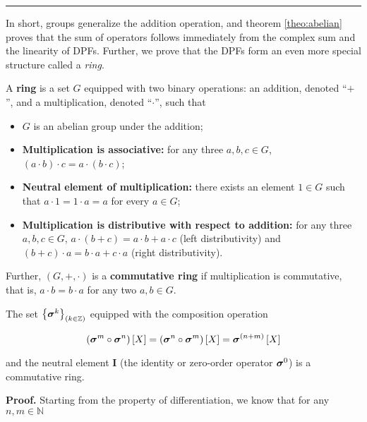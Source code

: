\vspace{5mm}
\hrule
\vspace{5mm} %

	In short, groups generalize the addition operation, and theorem \ref{theo:abelian} proves that the sum of operators follows immediately from the complex sum and the linearity of DPFs. Further, we prove that the DPFs form an even more special structure called a \textit{ring}.

\begin{definition}[Ring]%
	A \textbf{ring} is a set $G$ equipped with two binary operations: an addition, denoted ``$+$'', and a multiplication, denoted ``$\cdot$'', such that

\begin{itemize}
	\item $G$ is an abelian group under the addition;
	\item \textbf{Multiplication is associative:} for any three $a,b,c\in G$, $\left(a\cdot b\right)\cdot c = a\cdot \left(b\cdot c\right)$;
	\item \textbf{Neutral element of multiplication:} there exists an element $1\in G$ such that $a\cdot 1 = 1\cdot a = a$ for every $a\in G$;
	\item \textbf{Multiplication is distributive with respect to addition:} for any three $a,b,c\in G$, $a\cdot\left(b + c\right) = a\cdot b + a\cdot c$ (left distributivity) and $\left(b + c\right)\cdot a = b\cdot a + c\cdot a$ (right distributivity).
\end{itemize}

	Further, $\left(G,+,\cdot\right)$ is a \textbf{commutative ring} if multiplication is commutative, that is, $a \cdot b = b \cdot a$ for any two $a,b\in G$.
\end{definition} %

\begin{theorem}\label{theo:ring}%
	The set $\left\{\boldsymbol{\sigma}^{k}\right\}_{(k\in\mathbb{Z})}$ equipped with the composition operation

\begin{equation} \left(\boldsymbol{\sigma}^{m}\circ \boldsymbol{\sigma}^{n}\right)\left[X\right] = \left(\boldsymbol{\sigma}^{n}\circ \boldsymbol{\sigma}^{m}\right)\left[X\right] = \boldsymbol{\sigma}^{(n+m)}\left[X\right] \label{eq:ring_composition}\end{equation}

	\noindent and the neutral element $\mathbf{I}$ (the identity or zero-order operator $\boldsymbol{\sigma}^{0}$) is a commutative ring.
\end{theorem}
\textbf{Proof.} Starting from the property of differentiation, we know that for any $n,m\in\mathbb{N}$

